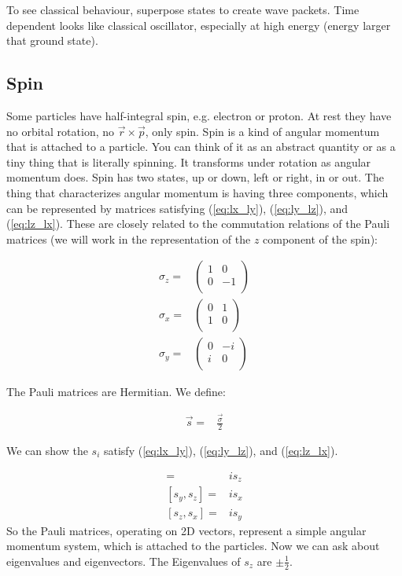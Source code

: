 \documentclass[]{article}
\begin{document}
To see classical behaviour, superpose states to create wave packets. Time dependent looks like classical oscillator, especially at high energy (energy larger that ground state).



\subsection{Spin}

Some particles have half-integral spin, e.g. electron or proton. At rest they have no orbital rotation, no $\vec{r}\times\vec{p}$, only spin. Spin is a kind of angular momentum that is attached to a particle. You can think of it as an abstract quantity or as a tiny thing that is literally spinning. It transforms under rotation as angular momentum does. Spin has two states, up or down, left or right, in or out. The thing that characterizes angular momentum is having three components, which can be represented by matrices satisfying (\ref{eq:lx_ly}), (\ref{eq:ly_lz}), and (\ref{eq:lz_lx}). These are closely related to the commutation relations of the Pauli matrices (we will work in the representation of the $z$ component of the spin):

\begin{align*}
	\sigma_z =& \begin{pmatrix}
		1 & 0 \\
		0 & -1\\
	\end{pmatrix} \\
	\sigma_x =& \begin{pmatrix}
		0 & 1 \\
		1 & 0\\
	\end{pmatrix}\\
	\sigma_y =& \begin{pmatrix}
		0 & -i \\
		i & 0\\
	\end{pmatrix}
\end{align*}

The Pauli matrices are Hermitian. We define:

\begin{align*}
	\vec{s} =& \frac{\vec{\sigma}}{2} 
\end{align*}

We can show the $s_i$ satisfy (\ref{eq:lx_ly}), (\ref{eq:ly_lz}), and (\ref{eq:lz_lx}).

\begin{align*}
	[s_x,s_y] =& i s_z \\
	[s_y,s_z] =& i s_x\\
	[s_z,s_x] =& i s_y
\end{align*}
So the Pauli matrices, operating on 2D vectors, represent a simple angular momentum system, which is attached to the particles. Now we can ask about eigenvalues and eigenvectors. The Eigenvalues of $s_z$ are $\pm \frac{1}{2}$. 
\end{document}

